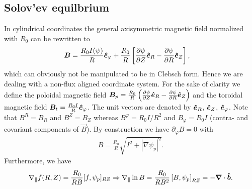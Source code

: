 \subsection{Solov'ev equilbrium}\label{sec:solovev}
In cylindrical coordinates the general axisymmetric magnetic field normalized with $R_0$ can be rewritten to
\begin{align}
 {\boldsymbol{B}} &= \frac{R_0I(\psi)}{R} \bm{\hat{e}}_{\varphi} + \frac{R_0}{R}\left[\frac{\partial \psi}{\partial Z} \bm{\hat{e}}_R 
         -  \frac{\partial \psi}{\partial R} \bm{\hat{e}}_Z\right] ,
\end{align}
which can obviously not be manipulated to be in Clebsch form. Hence we are dealing with a non-flux aligned coordinate system.
For the sake of clarity we define the poloidal magnetic field \( {\boldsymbol{B}}_p = \frac{R_0}{R}\left( \frac{\partial \psi}{\partial Z}\bm{\hat{e}}_R - \frac{\partial \psi}{\partial R}\bm{\hat{e}}_Z\right)
\) and the toroidal magnetic field \({\boldsymbol{B}}_t =\frac{R_0I}{R} \bm{\hat{e}}_{\varphi}\).
The unit vectors are denoted by \(\bm{\hat{e}}_{R}\), \(\bm{\hat{e}}_{Z}\), \(\bm{\hat{e}}_{\varphi}\). Note that $B^R=B_R$ and $B^Z=B_Z$ whereas
$B^\varphi = R_0I/R^2$ and $B_\varphi=R_0I$ (contra- and covariant components of $\vec B$).
By construction we have $\partial_\varphi B = 0$ with
\begin{align}
  B = \frac{R_0}{R}\sqrt{ {I^2 + |\nabla \psi_p|^2}}.
    \label{}
\end{align}
Furthermore, we have
\begin{align}
  \nabla_\parallel f(R,Z) = \frac{R_0}{RB}[f,\psi_p]_{RZ}\Rightarrow \nabla_\parallel \ln B = \frac{R_0}{RB^2}\left[B, \psi_p\right]_{RZ} = -{\boldsymbol{\nabla}}\cdot\bm{\hat{b}}.
    \label{}
\end{align}

